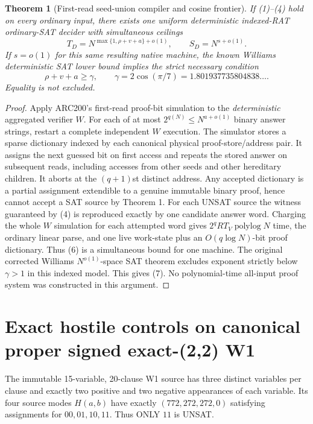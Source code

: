 \documentclass[11pt]{article}
\newtheorem{theorem}{Theorem}
\begin{document}
\begin{theorem}[First-read seed-union compiler and cosine frontier]
If (1)--(4) hold on every ordinary input, there exists
one uniform deterministic indexed-RAT ordinary-SAT decider
with simultaneous ceilings
\[
\boxed{T_D=N^{\max\{1,\rho+v+a\}+o(1)},\qquad
S_D=N^{s+o(1)}} . \tag{6}
\]
If $s=o(1)$ for this same resulting native machine, the
known Williams deterministic SAT lower bound implies the
strict necessary condition
\[
\boxed{\rho+v+a\ge\gamma,\qquad
       \gamma=2\cos(\pi/7)=1.801937735804838\ldots .} \tag{7}
\]
Equality is not excluded.
\end{theorem}
\begin{proof}
Apply ARC200's first-read proof-bit simulation to the
\emph{deterministic} aggregated verifier $W$.
For each of at most $2^{q(N)}\le N^{a+o(1)}$
binary answer strings, restart a complete independent $W$
execution. The simulator stores a sparse dictionary indexed
by each canonical physical proof-store/address pair. It
assigns the next guessed bit on first access and repeats
the stored answer on subsequent reads, including accesses
from other seeds and other hereditary children. It aborts
at the $(q+1)$st distinct address. Any accepted dictionary
is a partial assignment extendible to a genuine immutable
binary proof, hence cannot accept a SAT source by
Theorem 1. For each UNSAT source the witness guaranteed by
(4) is reproduced exactly by one candidate answer word.
Charging the whole $W$ simulation for each attempted
word gives $2^q RT_V\operatorname{polylog}N$ time,
the ordinary linear parse, and one live work-state
plus an $O(q\log N)$-bit proof dictionary.
Thus (6) is a simultaneous bound for one machine.
The original corrected Williams $N^{o(1)}$-space
SAT theorem excludes exponent strictly below
$\gamma>1$ in this indexed model. This gives (7).
No polynomial-time all-input proof system was constructed
in this argument.
\end{proof}

\section{Exact hostile controls on canonical proper signed exact-(2,2) W1}
The immutable 15-variable, 20-clause W1 source has three
distinct variables per clause and exactly two positive and
two negative appearances of each variable. Its four
source modes $H(a,b)$ have exactly
$(772,272,272,0)$ satisfying assignments for
$00,01,10,11$. Thus ONLY $11$ is UNSAT.
\end{document}
